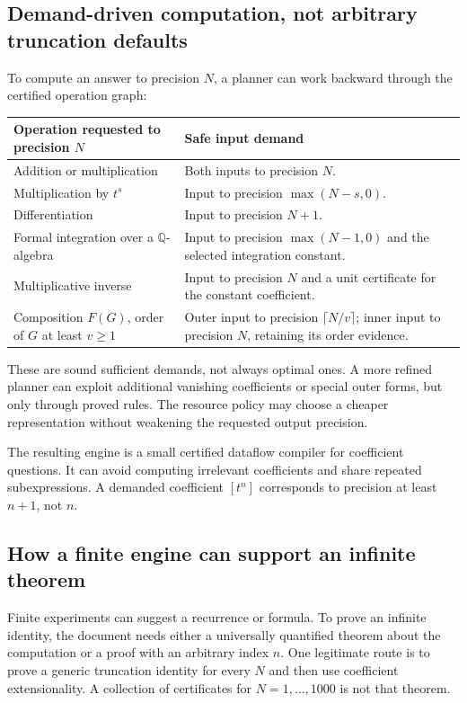 \documentclass[11pt,a4paper]{article}
\newcommand{\Q}{\mathbb Q}
\theoremstyle{definition}
\theoremstyle{remark}
\begin{document}
\subsection{Demand-driven computation, not arbitrary truncation defaults}
To compute an answer to precision $N$, a planner can work backward through the certified operation graph:
\begin{center}\small
\begin{tabularx}{\textwidth}{@{}P{.30\textwidth}Y@{}}
\toprule
Operation requested to precision $N$ & Safe input demand\\
\midrule
Addition or multiplication & Both inputs to precision $N$.\\
Multiplication by $t^s$ & Input to precision $\max(N-s,0)$.\\
Differentiation & Input to precision $N+1$.\\
Formal integration over a $\Q$-algebra & Input to precision $\max(N-1,0)$ and the selected integration constant.\\
Multiplicative inverse & Input to precision $N$ and a unit certificate for the constant coefficient.\\
Composition $F(G)$, order of $G$ at least $v\ge1$ & Outer input to precision $\lceil N/v\rceil$; inner input to precision $N$, retaining its order evidence.\\
\bottomrule
\end{tabularx}
\end{center}
These are sound sufficient demands, not always optimal ones. A more refined planner can exploit additional vanishing coefficients or special outer forms, but only through proved rules. The resource policy may choose a cheaper representation without weakening the requested output precision.

The resulting engine is a small certified dataflow compiler for coefficient questions. It can avoid computing irrelevant coefficients and share repeated subexpressions. A demanded coefficient $[t^n]$ corresponds to precision at least $n+1$, not $n$.

\subsection{How a finite engine can support an infinite theorem}
Finite experiments can suggest a recurrence or formula. To prove an infinite identity, the document needs either a universally quantified theorem about the computation or a proof with an arbitrary index $n$. One legitimate route is to prove a generic truncation identity for every $N$ and then use coefficient extensionality. A collection of certificates for $N=1,\ldots,1000$ is not that theorem.
\end{document}
